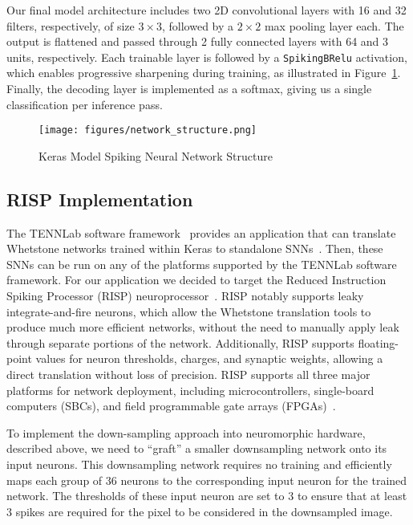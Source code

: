 \documentclass[conference]{IEEEtran}
\begin{document}
Our final model architecture includes two 2D convolutional layers with 16 and 32 filters, respectively, of size $3 \times 3$, followed by a $2 \times 2$ max pooling layer each. The output is flattened and passed through 2 fully connected layers with 64 and 3 units, respectively. Each trainable layer is followed by a \texttt{SpikingBRelu} activation, which enables progressive sharpening during training, as illustrated in Figure~\ref{fig:nn_structure}. Finally, the decoding layer is implemented as a softmax, giving us a single classification per inference pass.

\begin{figure}[!ht]
    \texttt{[image: figures/network\_structure.png]}
    \caption{Keras Model Spiking Neural Network Structure}
    \label{fig:nn_structure}
\end{figure}

\subsection{RISP Implementation}
The TENNLab software framework~\cite{framework} provides an application that can translate Whetstone networks trained within Keras to standalone SNNs~\cite{tennlab_whetstone}. Then, these SNNs can be run on any of the platforms supported by the TENNLab software framework. For our application we decided to target the Reduced Instruction Spiking Processor (RISP) neuroprocessor~\cite{RISP}. RISP notably supports leaky integrate-and-fire neurons, which allow the Whetstone translation tools to produce much more efficient networks, without the need to manually apply leak through separate portions of the network. Additionally, RISP supports floating-point values for neuron thresholds, charges, and synaptic weights, allowing a direct translation without loss of precision. RISP supports all three major platforms for network deployment, including microcontrollers, single-board computers (SBCs), and field programmable gate arrays (FPGAs)~\cite{risp_on_hardware}.

To implement the down-sampling approach into neuromorphic hardware, described above, we need to ``graft'' a smaller downsampling network onto its input neurons. This downsampling network requires no training and efficiently maps each group of 36 neurons to the corresponding input neuron for the trained network. The thresholds of these input neuron are set to $3$ to ensure that at least $3$ spikes are required for the pixel to be considered in the downsampled image.
\end{document}
